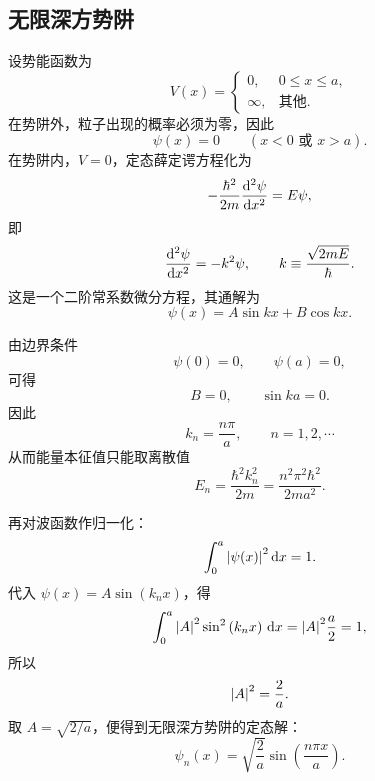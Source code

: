 \subsection{无限深方势阱}

设势能函数为
\begin{equation}
    V(x)=
    \begin{cases}
        0, & 0\le x\le a,\\
        \infty, & \text{其他}.
    \end{cases}
\end{equation}
在势阱外，粒子出现的概率必须为零，因此
\begin{equation}
    \psi(x)=0 \qquad \left( x<0 \text{ 或 } x>a \right).
\end{equation}
在势阱内，\(V=0\)，定态薛定谔方程化为
\begin{equation}
    -\frac{\hbar^2}{2m}\dv[2]{\psi}{x}=E\psi,
\end{equation}
即
\begin{equation}
    \dv[2]{\psi}{x}=-k^2\psi,
    \qquad
    k\equiv \frac{\sqrt{2mE}}{\hbar}.
\end{equation}
这是一个二阶常系数微分方程，其通解为
\begin{equation}
    \psi(x)=A\sin kx+B\cos kx.
\end{equation}

由边界条件
\begin{equation}
    \psi(0)=0,
    \qquad
    \psi(a)=0,
\end{equation}
可得
\begin{equation}
    B=0,
    \qquad
    \sin ka=0.
\end{equation}
因此
\begin{equation}
    k_n=\frac{n\pi}{a},
    \qquad
    n=1,2,\cdots
\end{equation}
从而能量本征值只能取离散值
\begin{equation}
    E_n=\frac{\hbar^2 k_n^2}{2m}
    =
    \frac{n^2\pi^2\hbar^2}{2ma^2}.
\end{equation}

再对波函数作归一化：
\begin{equation}
    \int_0^a \abs{\psi(x)}^2\,\dd x=1.
\end{equation}
代入 \(\psi(x)=A\sin\left( k_nx \right)\)，得
\begin{equation}
    \int_0^a \abs{A}^2\sin^2\left( k_nx \right)\,\dd x
    =
    \abs{A}^2\frac{a}{2}
    =1,
\end{equation}
所以
\begin{equation}
    \abs{A}^2=\frac{2}{a}.
\end{equation}
取 \(A=\sqrt{2/a}\)，便得到无限深方势阱的定态解：
\begin{equation}
    \psi_n(x)=\sqrt{\frac{2}{a}}\sin\left( \frac{n\pi x}{a} \right).
\end{equation}

